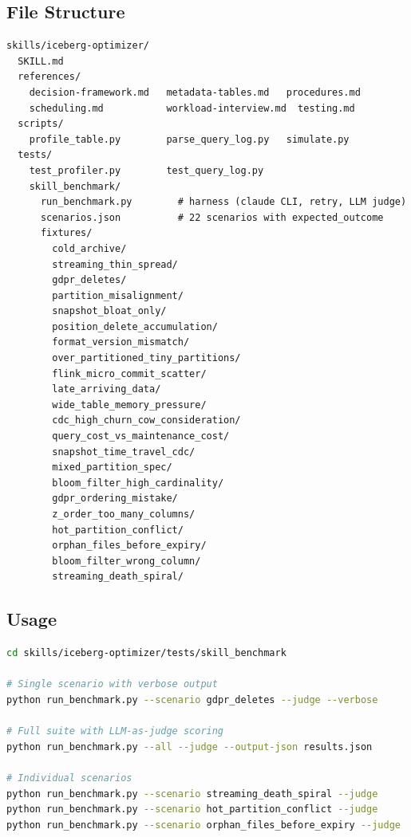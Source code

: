 \documentclass[11pt,a4paper]{article}
\begin{document}
\subsection{File Structure}

\begin{lstlisting}
skills/iceberg-optimizer/
  SKILL.md
  references/
    decision-framework.md   metadata-tables.md   procedures.md
    scheduling.md           workload-interview.md  testing.md
  scripts/
    profile_table.py        parse_query_log.py   simulate.py
  tests/
    test_profiler.py        test_query_log.py
    skill_benchmark/
      run_benchmark.py        # harness (claude CLI, retry, LLM judge)
      scenarios.json          # 22 scenarios with expected_outcome
      fixtures/
        cold_archive/
        streaming_thin_spread/
        gdpr_deletes/
        partition_misalignment/
        snapshot_bloat_only/
        position_delete_accumulation/
        format_version_mismatch/
        over_partitioned_tiny_partitions/
        flink_micro_commit_scatter/
        late_arriving_data/
        wide_table_memory_pressure/
        cdc_high_churn_cow_consideration/
        query_cost_vs_maintenance_cost/
        snapshot_time_travel_cdc/
        mixed_partition_spec/
        bloom_filter_high_cardinality/
        gdpr_ordering_mistake/
        z_order_too_many_columns/
        hot_partition_conflict/
        orphan_files_before_expiry/
        bloom_filter_wrong_column/
        streaming_death_spiral/
\end{lstlisting}

\subsection{Usage}

\begin{lstlisting}[language=bash]
cd skills/iceberg-optimizer/tests/skill_benchmark

# Single scenario with verbose output
python run_benchmark.py --scenario gdpr_deletes --judge --verbose

# Full suite with LLM-as-judge scoring
python run_benchmark.py --all --judge --output-json results.json

# Individual scenarios
python run_benchmark.py --scenario streaming_death_spiral --judge
python run_benchmark.py --scenario hot_partition_conflict --judge
python run_benchmark.py --scenario orphan_files_before_expiry --judge
\end{lstlisting}

\end{document}
